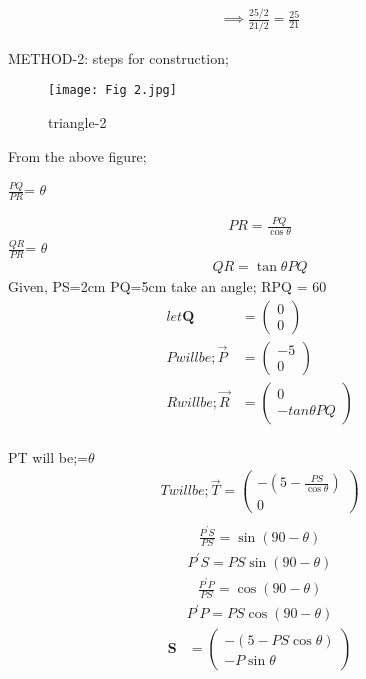 \documentclass[a4paper,12pt,two column]{article}
\theoremstyle{remark}
\newcommand{\myvec}[1]{\ensuremath{\begin{pmatrix}#1\end{pmatrix}}}
\let\vec\mathbf
\begin{document}
\begin{align}
\implies \frac{25/2}{21/2}=\frac{25}{21}
\end{align} 

\centering
{}

METHOD-2: steps for construction;

\begin{figure}[bht]
    \texttt{[image: Fig 2.jpg]}
    \caption{triangle-2}
    \label{}
\end{figure}

From the above figure;

    $\frac{PQ}{PR}$= \cos $\theta$

\begin{align}
    PR = \frac{PQ}{\cos \theta}
\end{align}
    $\frac{QR}{PR}$= \tan $\theta$
\begin{align}
    QR = \tan \theta PQ
\end{align}
Given, PS=2cm PQ=5cm 
take an angle;
\angle RPQ = 60{\degree}
\begin{align}
    let \vec{Q} &=\myvec{0 \\ 0}\\
    P will be; \Vec{P} &=\myvec{-5 \\ 0}\\
    R will be; \Vec{R} &=\myvec{0 \\ -tan\theta PQ}\\
\end{align}

PT will be;\implies {}=\cos$\theta$
\begin{align}
    T will be; \Vec{T}=\myvec{-(5-\frac{PS}{\cos\theta}) \\ 0}\\
\end{align}    
\begin{align}
    \frac{P^\prime S}{PS} = \sin(90-\theta)
\end{align}     
\begin{align}
    P^\prime S = PS \sin(90-\theta) 
\end{align}  
\begin{align}
    \frac{P^\prime P}{PS} = \cos(90-\theta)
\end{align}   
\begin{align}
    P^\prime P = PS \cos(90-\theta)
\end{align}    
\begin{align}
    \vec{S} &=\myvec{-(5 - PS \cos\theta) \\ -P \sin\theta}\\
\end{align}
\end{document}
